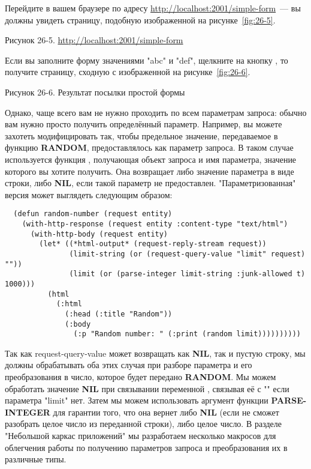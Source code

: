 Перейдите в вашем браузере по адресу \url{http://localhost:2001/simple-form}~--- вы должны
увидеть страницу, подобную изображенной на рисунке~\ref{fig:26-5}.

Рисунок 26-5. \url{http://localhost:2001/simple-form}

Если вы заполните форму значениями "abc" и "def", щелкните на кнопку , то
получите страницу, сходную с изображенной на рисунке~\ref{fig:26-6}.

Рисунок 26-6. Результат посылки простой формы

Однако, чаще всего вам не нужно проходить по всем параметрам запроса: обычно вам нужно
просто получить определённый параметр. Например, вы можете захотеть модифицировать
 так, чтобы предельное значение, передаваемое в функцию
\textbf{RANDOM}, предоставлялось как параметр запроса. В таком случае используется функция
, получающая объект запроса и имя параметра, значение которого
вы хотите получить. Она возвращает либо значение параметра в виде строки, либо
\textbf{NIL}, если такой параметр не предоставлен. "Параметризованная" версия
 может выглядеть следующим образом:

\begin{lstlisting}
  (defun random-number (request entity)
    (with-http-response (request entity :content-type "text/html")
      (with-http-body (request entity)
        (let* ((*html-output* (request-reply-stream request))
               (limit-string (or (request-query-value "limit" request) ""))
               (limit (or (parse-integer limit-string :junk-allowed t) 1000)))
          (html
            (:html
              (:head (:title "Random"))
              (:body
                (:p "Random number: " (:print (random limit))))))))))
\end{lstlisting}

Так как request-query-value может возвращать как \textbf{NIL}, так и пустую строку, мы
должны обрабатывать оба этих случая при разборе параметра и его преобразования в число,
которое будет передано \textbf{RANDOM}. Мы можем обработать значение \textbf{NIL} при
связывании переменной , связывая её с "" если параметра "limit"
нет. Затем мы можем использовать аргумент функции \textbf{PARSE-INTEGER}
 для гарантии того, что она вернет либо \textbf{NIL} (если не сможет
разобрать целое число из переданной строки), либо целое число. В разделе "Небольшой каркас
приложений" мы разработаем несколько макросов для облегчения работы по получению
параметров запроса и преобразования их в различные типы.

